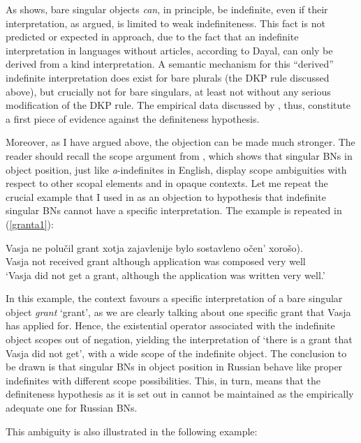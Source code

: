 \documentclass[output=paper,colorlinks,citecolor=brown]{langscibook}
\begin{document}
As \citet{geist10} shows, bare singular objects \textit{can}, in principle, be indefinite, even if their interpretation, as argued, is limited to weak indefiniteness. This fact is not predicted or expected in  approach, due to the fact that an indefinite interpretation in languages without articles, according to Dayal, can only be derived from a kind interpretation. A semantic mechanism for this ``derived'' indefinite interpretation does exist for bare plurals (the DKP rule discussed above), but crucially not for bare singulars, at least not without any serious modification of the DKP rule. The empirical data discussed by \citet{geist10}, thus, constitute a first piece of evidence against the definiteness hypothesis. 

Moreover, as I have argued above, the objection can be made much stronger. The reader should recall the scope argument from , which shows that singular BNs in object position, just like \textit{a}-indefinites in English, display scope ambiguities with respect to other scopal elements and in opaque contexts. Let me repeat the crucial example that I used in  as an objection to  hypothesis that indefinite singular BNs cannot have a specific interpretation. The example is repeated in (\ref{granta1}): 

\ea \label{granta1} \gll 
Vasja ne polu\v{c}il grant \minsp{(} xotja 	zajavlenije 	bylo sostavleno 	o\v{c}en'	xoro\v{s}o).\\
 Vasja not received grant {} although 	application 	was composed 		very 		well\\
\glt `Vasja did not get a grant, although the application was written very well.'		 	  
\z

\noindent In this example, the context favours a specific interpretation of a bare singular object \textit{grant} `grant', as we are clearly talking about one specific grant that Vasja has applied for. Hence, the existential operator associated with the indefinite object scopes out of negation, yielding the interpretation of `there is a grant that Vasja did not get', with a wide scope of the indefinite object. The conclusion to be drawn is that singular BNs in object position in Russian behave like proper indefinites with different scope possibilities. This, in turn, means that the definiteness hypothesis as it is set out in \citet{dayal04} cannot be maintained as the empirically adequate one for Russian BNs. 

\iffalse
  This ambiguity is also illustrated in the following example: 
\end{document}

